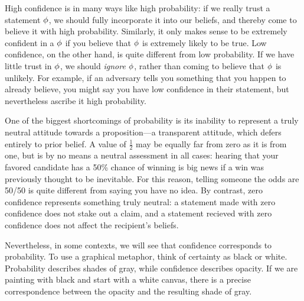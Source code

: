 \documentclass{article}
\begin{document}
High confidence is in many ways like high probability: if we really trust a statement $\phi$, we should fully incorporate it into our beliefs, and thereby come to believe it with high probability. 
Similarly, it only makes sense to be extremely confident in a $\phi$ if you believe that $\phi$ is extremely likely to be true. 
Low confidence, on the other hand, is quite different from low probability. 
If we have little trust in $\phi$, we should \emph{ignore} $\phi$, rather than coming to believe that $\phi$ is unlikely.
For example, if an adversary tells you something that you happen to already believe,
you might say you have low confidence in their statement, but nevertheless ascribe it high probability. 





One of the biggest shortcomings of probability is its inability to represent a truly neutral attitude towards a proposition---a transparent attitude, which defers entirely to prior belief.
A value of $\frac12$ may be equally far from zero as it is from one, but is by no means a neutral assessment in all cases: hearing that your favored candidate has a 50\% chance of winning is big news if a win was previously thought to be inevitable. 
For this reason, telling someone the odds are 50/50 is quite different from saying you have no idea. 
By contrast, zero confidence represents something truly neutral: 
	a statement made with zero confidence does not stake out a claim, and 
	a statement recieved with zero confidence does not affect the recipient's beliefs. 

Nevertheless, in some contexts, we will see that confidence corresponds to probability.
%
To use a graphical metaphor, think of certainty as black or white.
Probability describes shades of gray, while confidence describes opacity. 
If we are painting with black and start with a white canvas, there is a precise correspondence between the opacity and the resulting shade of gray.

\end{document}
